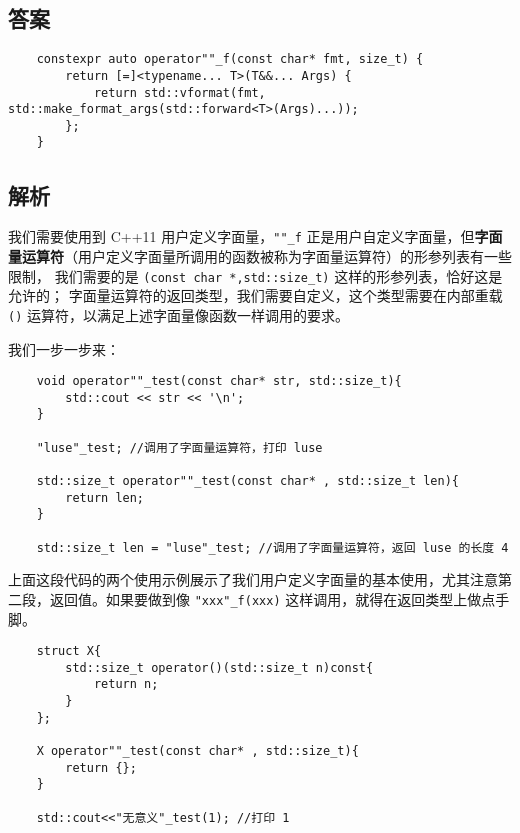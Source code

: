

\subsection{答案}

\begin{verbatim}
    constexpr auto operator""_f(const char* fmt, size_t) {
        return [=]<typename... T>(T&&... Args) { 
            return std::vformat(fmt, std::make_format_args(std::forward<T>(Args)...));
        };
    }
\end{verbatim}

\subsection{解析}


我们需要使用到 C++11 用户定义字面量，\texttt{""_f} 正是用户自定义字面量，但\textbf{字面量运算符}（用户定义字面量所调用的函数被称为字面量运算符）的形参列表有一些限制，
我们需要的是 \texttt{(const char *,std::size_t)} 这样的形参列表，恰好这是允许的；
字面量运算符的返回类型，我们需要自定义，这个类型需要在内部重载 \texttt{()} 运算符，以满足上述字面量像函数一样调用的要求。

我们一步一步来：

\begin{verbatim}
    void operator""_test(const char* str, std::size_t){
        std::cout << str << '\n';
    }
    
    "luse"_test; //调用了字面量运算符，打印 luse
    
    std::size_t operator""_test(const char* , std::size_t len){
        return len;
    }
    
    std::size_t len = "luse"_test; //调用了字面量运算符，返回 luse 的长度 4
\end{verbatim}

上面这段代码的两个使用示例展示了我们用户定义字面量的基本使用，尤其注意第二段，返回值。如果要做到像 \texttt{"xxx"_f(xxx)} 这样调用，就得在返回类型上做点手脚。

\begin{verbatim}
    struct X{
        std::size_t operator()(std::size_t n)const{
            return n;
        }
    };
    
    X operator""_test(const char* , std::size_t){
        return {};
    }
    
    std::cout<<"无意义"_test(1); //打印 1
\end{verbatim}

